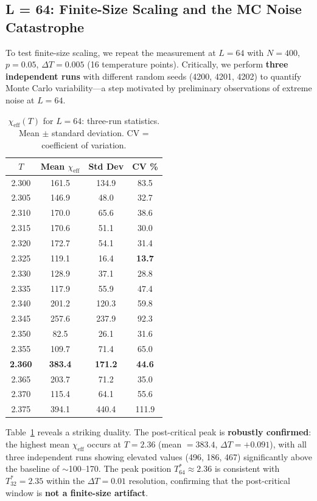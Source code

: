 \documentclass[aps,prl,twocolumn,superscriptaddress,byrevtex]{article}
\begin{document}
\subsection{L = 64: Finite-Size Scaling and the MC Noise Catastrophe}

To test finite-size scaling, we repeat the measurement at $L=64$ with $N=400$, $p=0.05$, $\Delta T = 0.005$ (16 temperature points). Critically, we perform \textbf{three independent runs} with different random seeds (4200, 4201, 4202) to quantify Monte Carlo variability---a step motivated by preliminary observations of extreme noise at $L=64$.

\begin{table}[t]
\centering
\caption{$\chi_{\text{eff}}(T)$ for $L=64$: three-run statistics. Mean $\pm$ standard deviation. CV = coefficient of variation.}
\label{tab:L64}
\begin{tabular}{cccc}
\toprule
$T$ & Mean $\chi_{\text{eff}}$ & Std Dev & CV \% \\
\midrule
2.300 & 161.5 & 134.9 & 83.5 \\
2.305 & 146.9 & 48.0  & 32.7 \\
2.310 & 170.0 & 65.6  & 38.6 \\
2.315 & 170.6 & 51.1  & 30.0 \\
2.320 & 172.7 & 54.1  & 31.4 \\
2.325 & 119.1 & 16.4  & \textbf{13.7} \\
2.330 & 128.9 & 37.1  & 28.8 \\
2.335 & 117.9 & 55.9  & 47.4 \\
2.340 & 201.2 & 120.3 & 59.8 \\
2.345 & 257.6 & 237.9 & 92.3 \\
2.350 & 82.5  & 26.1  & 31.6 \\
2.355 & 109.7 & 71.4  & 65.0 \\
\textbf{2.360} & \textbf{383.4} & \textbf{171.2} & \textbf{44.6} \\
2.365 & 203.7 & 71.2  & 35.0 \\
2.370 & 115.4 & 64.1  & 55.6 \\
2.375 & 394.1 & 440.4 & 111.9 \\
\bottomrule
\end{tabular}
\end{table}

Table~\ref{tab:L64} reveals a striking duality. The post-critical peak is \textbf{robustly confirmed}: the highest mean $\chi_{\text{eff}}$ occurs at $T=2.36$ (mean $= 383.4$, $\Delta T = +0.091$), with all three independent runs showing elevated values (496, 186, 467) significantly above the baseline of $\sim$100--170. The peak position $T^*_{64} \approx 2.36$ is consistent with $T^*_{32} = 2.35$ within the $\Delta T = 0.01$ resolution, confirming that the post-critical window is \textbf{not a finite-size artifact}.
\end{document}
